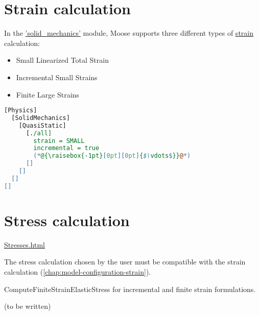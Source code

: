 \section{Strain calculation}
\label{chap:model-configuration-strain}

In the
\href{https://mooseframework.inl.gov/modules/solid_mechanics/}{'solid\_mechanics'}
module, Moose supports three different types of
\href{https://mooseframework.inl.gov/modules/solid_mechanics/Strains.html}{strain}
calculation:
\begin{itemize}
  \item {Small Linearized Total Strain}
  \item {Incremental Small Strains}
  \item {Finite Large Strains}
\end{itemize}

\begin{lstlisting}[language=perl, caption={Setting up incremental small strains within the Physics/SolidMechanics block},label={setup-incremental-small-strains}]
[Physics]
  [SolidMechanics]
    [QuasiStatic]
      [./all]
        strain = SMALL
        incremental = true
        (*@{\raisebox{-1pt}[0pt][0pt]{$\vdots$}}@*)
      []
    []
  []
[]
\end{lstlisting}

\section{Stress calculation}
\label{chap:model-configuration-stress}

\href{https://mooseframework.inl.gov/modules/solid_mechanics/Stresses.html}{Stresses.html}

The stress calculation chosen by the user must be compatible with the strain
calculation (\autoref{chap:model-configuration-strain}).

ComputeFiniteStrainElasticStress for incremental and finite strain
formulations.

(to be written)